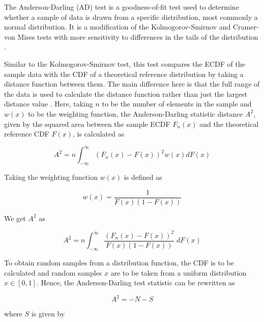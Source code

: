 \documentclass[12pt]{article}
\begin{document}
The Anderson-Darling (AD) test is a goodness-of-fit test used to determine whether a sample of data is drawn from a specific distribution, most commonly a normal distribution. It is a modification of the Kolmogorov-Smirnov and Cramer-von Mises tests with more sensitivity to differences in the tails of the distribution \cite{guthrie_nistsematech_2020, Michael_2025_statsref}.

\medskip
\noindent Similar to the Kolmogorov-Smirnov test, this test compares the ECDF of the sample data with the CDF of a theoretical reference distribution by taking a distance function between them. The main difference here is that the full range of the data is used to calculate the distance function rather than just the largest distance value \cite{Michael_2025_statsref}. Here, taking $n$ to be the number of elements in the sample and $w(x)$ to be the weighting function, the Anderson-Darling statistic distance $A^2$, given by the squared area between the sample ECDF $F_n(x)$ and the theoretical reference CDF $F(x)$, is calculated as

\begin{equation}
  A^2 = n \int_{-\infty}^{\infty} \left( F_n(x) - F(x) \right)^2 w(x) dF(x)
  \label{eq:ad_distance_function}
\end{equation}

\medskip
\noindent Taking the weighting function $w(x)$ is defined as

\begin{equation}
    w(x) = \frac{1}{F(x) (1 - F(x))}
    \label{eq:ad_weighting_function}
\end{equation}

\medskip
\noindent We get $A^2$ \cite{anderson1954test} as

\begin{equation}
    A^2 = n \int_{-\infty}^{\infty} \frac{\left( F_n(x) - F(x) \right)^2}{F(x)(1 - F(x))} \; dF(x)
    \label{eq:ad_statistic_distance_updated}
\end{equation}

\medskip
\noindent To obtain random samples from a distribution function, the CDF is to be calculated and random samples $x$ are to be taken from a uniform distribution $x \in [0, 1]$. Hence, the Anderson-Darling test statistic can be rewritten as

\begin{equation}
    A^2 = -N -S
    \label{eq:ad_statistic}
\end{equation}

\medskip
\noindent where $S$ is given by
\end{document}
